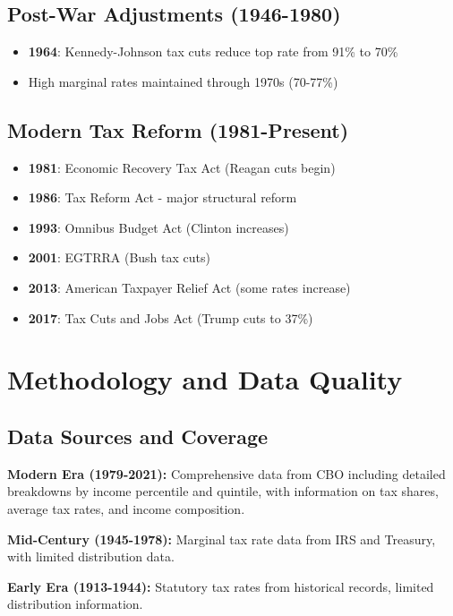 \documentclass[11pt,letterpaper]{article}
\begin{document}
\subsection{Post-War Adjustments (1946-1980)}
\begin{itemize}
    \item \textbf{1964}: Kennedy-Johnson tax cuts reduce top rate from 91\% to 70\%
    \item High marginal rates maintained through 1970s (70-77\%)
\end{itemize}

\subsection{Modern Tax Reform (1981-Present)}
\begin{itemize}
    \item \textbf{1981}: Economic Recovery Tax Act (Reagan cuts begin)
    \item \textbf{1986}: Tax Reform Act - major structural reform
    \item \textbf{1993}: Omnibus Budget Act (Clinton increases)
    \item \textbf{2001}: EGTRRA (Bush tax cuts)
    \item \textbf{2013}: American Taxpayer Relief Act (some rates increase)
    \item \textbf{2017}: Tax Cuts and Jobs Act (Trump cuts to 37\%)
\end{itemize}

\newpage

\section{Methodology and Data Quality}

\subsection{Data Sources and Coverage}

\textbf{Modern Era (1979-2021):} Comprehensive data from CBO including detailed breakdowns by income percentile and quintile, with information on tax shares, average tax rates, and income composition.

\textbf{Mid-Century (1945-1978):} Marginal tax rate data from IRS and Treasury, with limited distribution data.

\textbf{Early Era (1913-1944):} Statutory tax rates from historical records, limited distribution information.
\end{document}
